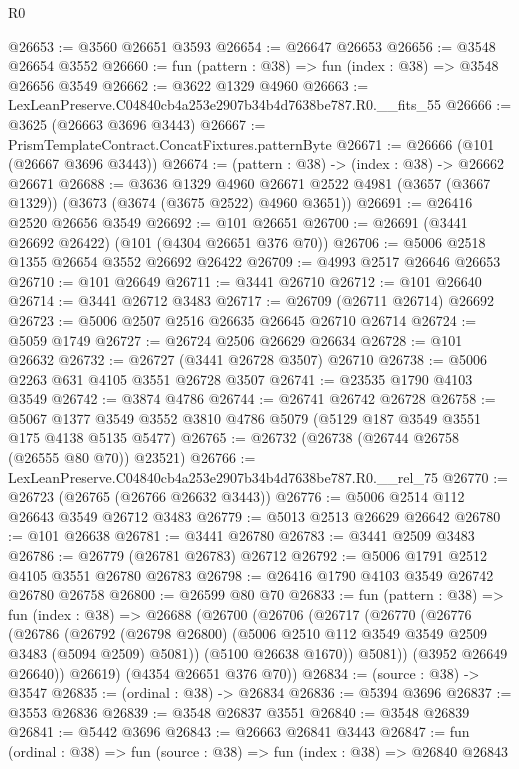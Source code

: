 \begin{lexlean}{R0}
\begin{coremodule}
@26653 := @3560 @26651 @3593
@26654 := @26647 @26653
@26656 := @3548 @26654 @3552
@26660 := fun (pattern : @38) => fun (index : @38) => @3548 @26656 @3549
@26662 := @3622 @1329 @4960
@26663 := LexLeanPreserve.C04840cb4a253e2907b34b4d7638be787.R0.__fits_55
@26666 := @3625 (@26663 @3696 @3443)
@26667 := PrismTemplateContract.ConcatFixtures.patternByte
@26671 := @26666 (@101 (@26667 @3696 @3443))
@26674 := (pattern : @38) -> (index : @38) -> @26662 @26671
@26688 := @3636
    @1329
    @4960
    @26671
    @2522
    @4981
    (@3657 (@3667 @1329))
    (@3673 (@3674 (@3675 @2522) @4960 @3651))
@26691 := @26416 @2520 @26656 @3549
@26692 := @101 @26651
@26700 := @26691 (@3441 @26692 @26422) (@101 (@4304 @26651 @376 @70))
@26706 := @5006 @2518 @1355 @26654 @3552 @26692 @26422
@26709 := @4993 @2517 @26646 @26653
@26710 := @101 @26649
@26711 := @3441 @26710
@26712 := @101 @26640
@26714 := @3441 @26712 @3483
@26717 := @26709 (@26711 @26714) @26692
@26723 := @5006 @2507 @2516 @26635 @26645 @26710 @26714
@26724 := @5059 @1749
@26727 := @26724 @2506 @26629 @26634
@26728 := @101 @26632
@26732 := @26727 (@3441 @26728 @3507) @26710
@26738 := @5006 @2263 @631 @4105 @3551 @26728 @3507
@26741 := @23535 @1790 @4103 @3549
@26742 := @3874 @4786
@26744 := @26741 @26742 @26728
@26758 := @5067 @1377 @3549 @3552 @3810 @4786 @5079 (@5129 @187 @3549 @3551 @175 @4138 @5135 @5477)
@26765 := @26732 (@26738 (@26744 @26758 (@26555 @80 @70)) @23521)
@26766 := LexLeanPreserve.C04840cb4a253e2907b34b4d7638be787.R0.__rel_75
@26770 := @26723 (@26765 (@26766 @26632 @3443))
@26776 := @5006 @2514 @112 @26643 @3549 @26712 @3483
@26779 := @5013 @2513 @26629 @26642
@26780 := @101 @26638
@26781 := @3441 @26780
@26783 := @3441 @2509 @3483
@26786 := @26779 (@26781 @26783) @26712
@26792 := @5006 @1791 @2512 @4105 @3551 @26780 @26783
@26798 := @26416 @1790 @4103 @3549 @26742 @26780 @26758
@26800 := @26599 @80 @70
@26833 := fun (pattern : @38) =>
  fun (index : @38) =>
  @26688
    (@26700
      (@26706
        (@26717
          (@26770
            (@26776
              (@26786
                (@26792
                  (@26798 @26800)
                  (@5006 @2510 @112 @3549 @3549 @2509 @3483 (@5094 @2509) @5081))
                (@5100 @26638 @1670))
              @5081))
          (@3952 @26649 @26640))
        @26619)
      (@4354 @26651 @376 @70))
@26834 := (source : @38) -> @3547
@26835 := (ordinal : @38) -> @26834
@26836 := @5394 @3696
@26837 := @3553 @26836
@26839 := @3548 @26837 @3551
@26840 := @3548 @26839
@26841 := @5442 @3696
@26843 := @26663 @26841 @3443
@26847 := fun (ordinal : @38) => fun (source : @38) => fun (index : @38) => @26840 @26843

\end{coremodule}
\end{lexlean}
